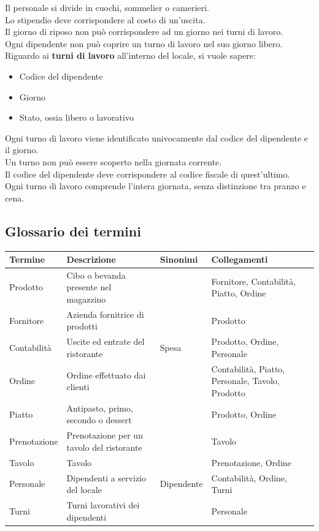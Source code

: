 Il personale si divide in cuochi, sommelier o camerieri.\\
Lo stipendio deve corrispondere al costo di un'uscita. \\
Il giorno di riposo non può corrispondere ad un giorno nei turni di lavoro. \\
Ogni dipendente non può coprire un turno di lavoro nel suo giorno libero. \medskip \\
Riguardo ai \textbf{turni di lavoro} all’interno del locale, si vuole sapere:
\begin{itemize}
    \item Codice del dipendente
    \item Giorno
    \item Stato, ossia libero o lavorativo
\end{itemize}
Ogni turno di lavoro viene identificato univocamente dal codice del dipendente e il giorno.\\
Un turno non può essere scoperto nella giornata corrente. \\
Il codice del dipendente deve corrispondere al codice fiscale di quest'ultimo. \\
Ogni turno di lavoro comprende l'intera giornata, senza distinzione tra pranzo e cena.\medskip \\

\subsection{Glossario dei termini}
\begin{longtable}{p{2.5cm} p{4.5cm} p{2cm} p{5cm}}
    \toprule
    \textbf{Termine} & \textbf{Descrizione} & \textbf{Sinonimi} & \textbf{Collegamenti}\\ \midrule
    Prodotto & Cibo o bevanda presente nel magazzino & & Fornitore, Contabilità, Piatto, Ordine \\ \midrule
    Fornitore & Azienda fornitrice di prodotti & & Prodotto \\ \midrule
    Contabilità & Uscite ed entrate del ristorante & Spesa & Prodotto, Ordine, Personale \\ \midrule
    Ordine & Ordine effettuato dai clienti & & Contabilità, Piatto, Personale, Tavolo, Prodotto \\ \midrule
    Piatto & Antipasto, primo, secondo o dessert & & Prodotto, Ordine \\ \midrule
    Prenotazione & Prenotazione per un tavolo del ristorante & & Tavolo \\ \midrule
    Tavolo & Tavolo & & Prenotazione, Ordine\\ \midrule
    Personale & Dipendenti a servizio del locale & Dipendente & Contabilità, Ordine, Turni\\ \midrule
    Turni & Turni lavorativi dei dipendenti & & Personale	\\ \midrule
\end{longtable}

